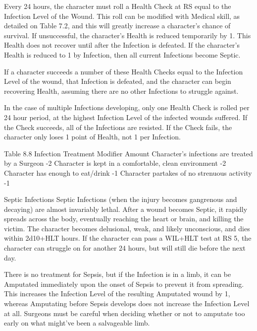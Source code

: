 \documentclass[oneside,11pt,english]{book}
\begin{document}
 

Every 24 hours, the character must roll a Health Check at RS equal to the Infection Level of the Wound. 
This roll can be modified with Medical skill, as detailed on Table 7.2, and this will greatly increase a 
character’s chance of survival. If unsuccessful, the character’s Health is reduced temporarily by 1. This 
Health does not recover until after the Infection is defeated. If the character’s Health is reduced to 1 by 
Infection, then all current Infections become Septic. 

 

If a character succeeds a number of these Health Checks equal to the Infection Level of the wound, that 
Infection is defeated, and the character can begin recovering Health, assuming there are no other 
Infections to struggle against. 

 

In the case of multiple Infections developing, only one Health Check is rolled per 24 hour period, at the 
highest Infection Level of the infected wounds suffered. If the Check succeeds, all of the Infections are 
resisted. If the Check fails, the character only loses 1 point of Health, not 1 per Infection. 

 

Table 8.8 Infection Treatment 
Modifier Amount 
Character’s infections are treated by a Surgeon -2 
Character is kept in a comfortable, clean environment -2 
Character has enough to eat/drink -1 
Character partakes of no strenuous activity -1 

 

 

Septic Infections 
Septic Infections (when the injury becomes gangrenous and decaying) are almost invariably lethal. After 
a wound becomes Septic, it rapidly spreads across the body, eventually reaching the heart or brain, and 
killing the victim. The character becomes delusional, weak, and likely unconscious, and dies within 
2d10+HLT hours. If the character can pass a WIL+HLT test at RS 5, the character can struggle on for 
another 24 hours, but will still die before the next day. 

 

There is no treatment for Sepsis, but if the Infection is in a limb, it can be Amputated immediately upon 
the onset of Sepsis to prevent it from spreading. This increases the Infection Level of the resulting 
Amputated wound by 1, whereas Amputating before Sepsis develops does not increase the Infection 
Level at all. Surgeons must be careful when deciding whether or not to amputate too early on what 
might’ve been a salvageable limb. 
\end{document}
